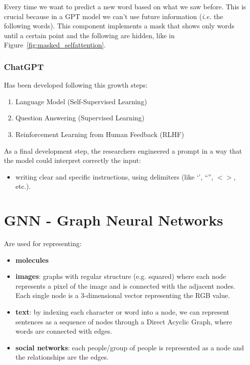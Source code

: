 \documentclass[oneside]{academica}
\begin{document}
Every time we want to predict a new word based on what we saw before.
This is crucial because in a GPT model we can't use future information (\textit{i.e.} the following words).
This component implements a mask that shows only words until a certain point and the following are hidden, like in Figure~\ref{fig:masked_selfattention}.

\subsection{ChatGPT}

Has been developed following this growth steps:
\begin{enumerate}
  \item Language Model (Self-Supervised Learning)
  \item Question Answering (Supervised Learning)
  \item Reinforcement Learning from Human Feedback (RLHF)
\end{enumerate}

As a final development step, the researchers engineered a prompt in a way that the model could interpret correctly the input:
\begin{itemize}
  \item writing clear and specific instructions, using delimiters (like `', ``'', $<>$, etc.).
\end{itemize}

\chapter{GNN - Graph Neural Networks}

Are used for representing:
\begin{itemize}
  \item \textbf{molecules}
  \item \textbf{images}: graphs with regular structure (e.g. squared) where each node represents a pixel of the image and is connected with the adjacent nodes. Each single node is a 3-dimensional vector representing the RGB value.
  \item \textbf{text}: by indexing each character or word into a node, we can represent sentences as a sequence of nodes through a Direct Acyclic Graph, where words are connected with edges.
  \item \textbf{social networks}: each people/group of people is represented as a node and the relationships are the edges.
\end{itemize}
\end{document}
